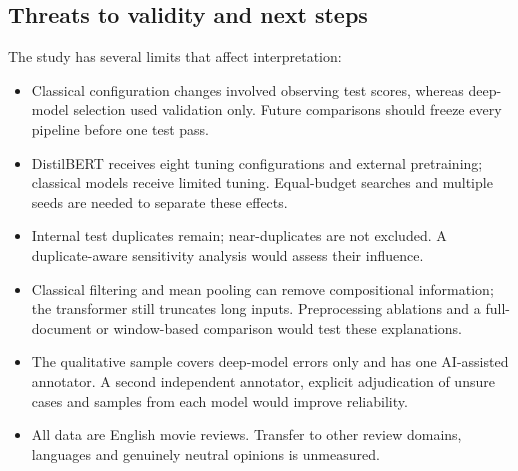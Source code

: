 \subsection{Threats to validity and next steps}
The study has several limits that affect interpretation:
\begin{itemize}
\item Classical configuration changes involved observing test scores, whereas
      deep-model selection used validation only. Future comparisons should freeze
      every pipeline before one test pass.
\item DistilBERT receives eight tuning configurations and external pretraining;
      classical models receive limited tuning. Equal-budget searches and
      multiple seeds are needed to separate these effects.
\item Internal test duplicates remain; near-duplicates are not excluded. A
      duplicate-aware sensitivity analysis would assess their influence.
\item Classical filtering and mean pooling can remove compositional information;
      the transformer still truncates long inputs. Preprocessing ablations and
      a full-document or window-based comparison would test these explanations.
\item The qualitative sample covers deep-model errors only and has one
      AI-assisted annotator. A second independent annotator, explicit adjudication
      of unsure cases and samples from each model would improve reliability.
\item All data are English movie reviews. Transfer to other review domains,
      languages and genuinely neutral opinions is unmeasured.
\end{itemize}
\FloatBarrier
